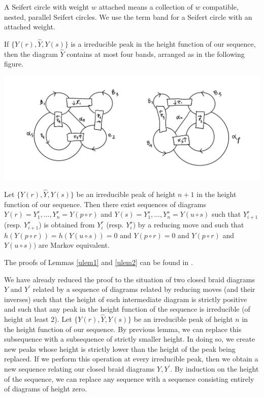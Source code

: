 A Seifert circle with weight $w$ attached means a collection of $w$ compatible, nested, parallel Seifert circles. We use the term band for a Seifert circle with an attached weight.

\begin{lemma}
  \label{ulem1}
  If $\{Y(r), \hat{Y}, Y(s) \}$ is a irreducible peak in the height function of our sequence, then the diagram $\hat{Y}$ contains at most four bands, arranged as in the following figure.
\end{lemma}
\begin{center}
 \includegraphics[scale=.25]{images/7.png}
\end{center}

  \begin{lemma}
   \label{ulem2}
 Let $\{ Y(r), \hat{Y}, Y(s)\}$ be an irreducible peak of height $n+1$ in the height function of our sequence. Then there exist sequences of diagrams $Y(r) = Y_1^r, \ldots, Y_n^r = Y(p \circ r)$ and $Y(s) = Y_1^s, \ldots, Y_n^s = Y (u \circ s)$ such that $Y^r_{i+1} $ (resp. $Y^s_{i+1}$) is obtained from $Y_i^r$ (resp. $Y_i^s$) by a reducing move and such that $h(Y(p \circ r)) = h(Y(u\circ s)) = 0$ and $Y(p\circ r) = 0$ and $Y(p \circ r) $ and $Y(u \circ s))$ are Markov equivalent.
   \end{lemma}

The proofs of Lemmas \ref{ulem1} and \ref{ulem2} can be found in \cite{Bsurvey}.

  We have already reduced the proof to the situation of two closed braid diagrams $Y$ and $Y^{\prime}$ related by a sequence of diagrams related by reducing moves (and their inverses) such that the height of each intermediate diagram is strictly positive and such that any peak in the height function of the sequence is irreducible (of height at least 2). Let $\{ Y(r), \hat{Y}, Y(s)\}$ be an irreducible peak of height $n$ in the height function of our sequence. By previous lemma, we can replace this subsequence with a subsequence of strictly smaller height. In doing so, we create new peaks whose height is strictly lower than the height of the peak being replaced. If we perform this operation at every irreducible peak, then we obtain a new
sequence relating our closed braid diagrams $Y, Y^{\prime}$. By induction on the height of the sequence, we can replace any sequence with a sequence consisting entirely of diagrams of height zero.


